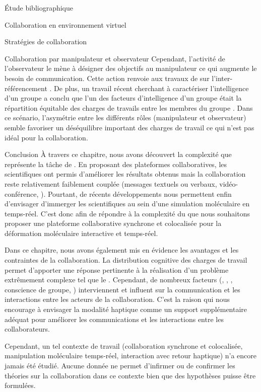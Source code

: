 \documentclass[myfrancais,ngerman,english,frenchb]{mythesis}
\begin{document}
\begin{mychapter}{Étude bibliographique}
\begin{mysection}{Collaboration en environnement virtuel}
\begin{mysubsection}{Stratégies de collaboration}
\begin{mysubsubsection}{Collaboration par manipulateur et observateur}
					Cependant, l'activité de l'observateur le mène à désigner des objectifs au manipulateur ce qui augmente le besoin de communication.
					Cette action renvoie aux travaux de  sur l'inter-référencement .
					De plus, un travail récent cherchant à caractériser \og l'intelligence d'un groupe \fg a conclu que l'un des facteurs d'intelligence d'un groupe était la répartition équitable des charges de travails entre les membres du groupe .
					Dans ce scénario, l'asymétrie entre les différents rôles (manipulateur et observateur) semble favoriser un déséquilibre important des charges de travail ce qui n'est pas idéal pour la collaboration.
				\end{mysubsubsection}
			\end{mysubsection}
		\end{mysection}
		\begin{mysection}{Conclusion}
			À travers ce chapitre, nous avons découvert la complexité que représente la tâche de .
			En proposant des plateformes collaboratives, les scientifiques ont permis d'améliorer les résultats obtenus mais la collaboration reste relativement faiblement couplée (messages textuels ou verbaux, vidéo-conférence, \myetc).
			Pourtant, de récents développements nous permettent enfin d'envisager d'immerger les scientifiques au sein d'une simulation moléculaire en temps-réel.
			C'est donc afin de répondre à la complexité du  que nous souhaitons proposer une plateforme collaborative synchrone et colocalisée pour la déformation moléculaire interactive et temps-réel.

			Dans ce chapitre, nous avons également mis en évidence les avantages et les contraintes de la collaboration.
			La distribution cognitive des charges de travail permet d'apporter une réponse pertinente à la réalisation d'un problème extrêmement complexe tel que le .
			Cependant, de nombreux facteurs (, , \mygrounding, conscience de groupe, \myetc) interviennent et influent sur la communication et les interactions entre les acteurs de la collaboration.
			C'est la raison qui nous encourage à envisager la modalité haptique comme un support supplémentaire adéquat pour améliorer les communications et les interactions entre les collaborateurs.

			Cependant, un tel contexte de travail (collaboration synchrone et colocalisée, manipulation moléculaire temps-réel, interaction avec retour haptique) n'a encore jamais été étudié.
			Aucune donnée ne permet d'infirmer ou de confirmer les théories sur la collaboration dans ce contexte bien que des hypothèses puisse être formulées.


\end{mysection}
\end{mychapter}
\end{document}
